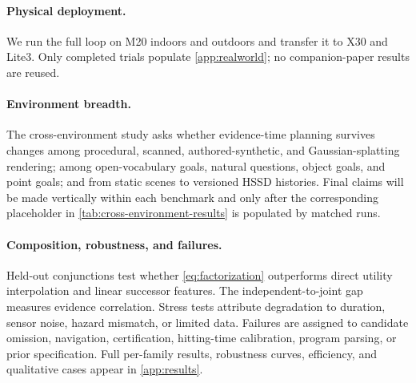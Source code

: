 \paragraph{Physical deployment.}
We run the full loop on M20 indoors and outdoors and transfer it to X30 and Lite3.
Only completed trials populate \cref{app:realworld}; no companion-paper results are reused.

\begin{table}[t]
  \centering
  \caption{\textbf{Cross-environment generalization.}
  All methods use the same hidden-task interruption wrapper within a domain, while scene splits, goals, and success rules remain benchmark-native.}
  \label{tab:cross-environment-results}
\end{table}

\paragraph{Environment breadth.}
The cross-environment study asks whether evidence-time planning survives changes among procedural, scanned, authored-synthetic, and Gaussian-splatting rendering; among open-vocabulary goals, natural questions, object goals, and point goals; and from static scenes to versioned HSSD histories.
Final claims will be made vertically within each benchmark and only after the corresponding placeholder in \cref{tab:cross-environment-results} is populated by matched runs.

\begin{table}[t]
  \centering
  \caption{\textbf{Composition and arrival ablations.}
  Report downstream AWU together with evidence-time calibration.}
  \label{tab:ablations}
\end{table}

\paragraph{Composition, robustness, and failures.}
Held-out conjunctions test whether \cref{eq:factorization} outperforms direct utility interpolation and linear successor features.
The independent-to-joint gap measures evidence correlation.
Stress tests attribute degradation to duration, sensor noise, hazard mismatch, or limited data.
Failures are assigned to candidate omission, navigation, certification, hitting-time calibration, program parsing, or prior specification.
Full per-family results, robustness curves, efficiency, and qualitative cases appear in \cref{app:results}.
